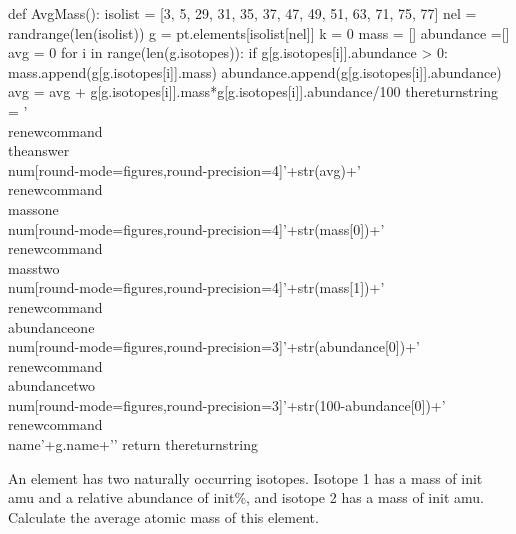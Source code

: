 



\begin{pycode}

def AvgMass():
	isolist = [3, 5, 29, 31, 35, 37, 47, 49, 51, 63, 71, 75, 77]
	nel = randrange(len(isolist))
	g = pt.elements[isolist[nel]]
	k = 0
	mass = []
	abundance =[]
	avg = 0
	for i in range(len(g.isotopes)):
		if g[g.isotopes[i]].abundance > 0:
			mass.append(g[g.isotopes[i]].mass)
			abundance.append(g[g.isotopes[i]].abundance)
			avg = avg + g[g.isotopes[i]].mass*g[g.isotopes[i]].abundance/100
	thereturnstring = '\\renewcommand{\\theanswer}{\\num[round-mode=figures,round-precision=4]{'+str(avg)+'}}  \
	\\renewcommand{\\massone}{\\num[round-mode=figures,round-precision=4]{'+str(mass[0])+'}}  \
	\\renewcommand{\\masstwo}{\\num[round-mode=figures,round-precision=4]{'+str(mass[1])+'}}  \
	\\renewcommand{\\abundanceone}{\\num[round-mode=figures,round-precision=3]{'+str(abundance[0])+'}}  \
		\\renewcommand{\\abundancetwo}{\\num[round-mode=figures,round-precision=3]{'+str(100-abundance[0])+'}}  \
	\\renewcommand{\\name}{'+g.name+'}' 
	return thereturnstring

\end{pycode}

\providecommand{\theanswer}{init}
\providecommand{\massone}{init}
\providecommand{\masstwo}{init}
\providecommand{\abundanceone}{init}
\providecommand{\abundancetwo}{init}
\providecommand{\name}{init}


\py{AvgMass()}

An element has two naturally occurring isotopes. Isotope 1 has a mass of \massone{} amu and a relative abundance of \abundanceone{}\%, and isotope 2 has a mass of \masstwo{} amu. Calculate the average atomic mass of this element. \answerline[\theanswer{} amu, \name]

